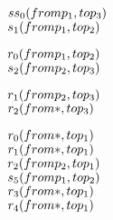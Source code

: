 \newcommand{\reduce}[1]{\ensuremath{\rightarrow_{#1}}}

\newsavebox{\syncZero}
\begin{lrbox}{\syncZero}
\begin{minipage}[t]{0.6\linewidth}
\large
\begin{alltt}
\(ss\sb{0}(from p\sb{1}, to p\sb{3})\)
\(s\sb{1}(from p\sb{1}, to p\sb{2})\)
\end{alltt}
\end{minipage}
\end{lrbox}

\newsavebox{\syncOne}
\begin{lrbox}{\syncOne}
\begin{minipage}[t]{0.6\linewidth}
\large
\begin{alltt}
\(r\sb{0}(from p\sb{1}, to p\sb{2})\)
\(s\sb{2}(from p\sb{2}, to p\sb{3})\)
\end{alltt}
\end{minipage}
\end{lrbox}

\newsavebox{\syncTwo}
\begin{lrbox}{\syncTwo}
\begin{minipage}[t]{0.6\linewidth}
\large
\begin{alltt}
\(r\sb{1}(from p\sb{2}, to p\sb{3})\)
\(r\sb{2}(from \ast, to p\sb{3})\)
\end{alltt}
\end{minipage}
\end{lrbox}


\newcommand\syncexample{
\begin{figure*}[tb]
\begin{center}
\setlength{\tabcolsep}{2pt}
\begin{tabular}[t]{c|c|c}
$\mathit{p_1}$ & $\mathit{p_2}$ & $\mathit{p_3}$ \\
\hline
\scalebox{0.8}{\usebox{\syncZero}}&
\scalebox{0.8}{\usebox{\syncOne}} &
\scalebox{0.8}{\usebox{\syncTwo}}
\end{tabular}
\end{center}
\caption{A simple concurrent trace program with synchronous send.}
\label{fig:syncexample}
\end{figure*}
}

\newsavebox{\readyZero}
\begin{lrbox}{\readyZero}
\begin{minipage}[t]{0.6\linewidth}
\large
\begin{alltt}
\(r\sb{0}(from \ast, to p\sb{1})\)
\(r\sb{1}(from \ast, to p\sb{1})\)
\(r\sb{2}(from p\sb{2}, to p\sb{1})\)
\(s\sb{5}(from p\sb{1}, to p\sb{2})\)
\(r\sb{3}(from \ast, to p\sb{1})\)
\(r\sb{4}(from \ast, to p\sb{1})\)
\end{alltt}
\end{minipage}
\end{lrbox}

